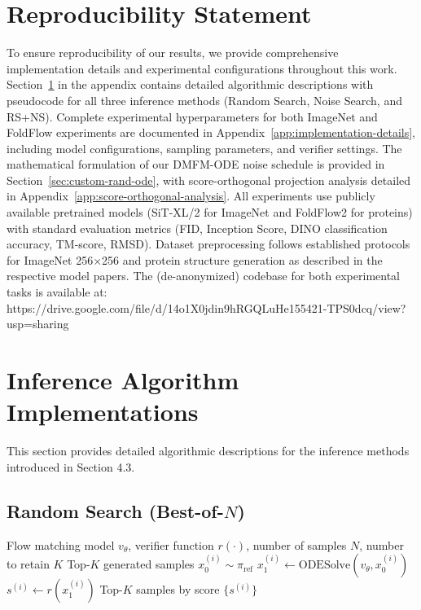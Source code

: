 \documentclass{article} %
\begin{document}
\section*{Reproducibility Statement}
To ensure reproducibility of our results, we provide comprehensive implementation details and experimental configurations throughout this work. Section~\ref{sec:algorithms} in the appendix contains detailed algorithmic descriptions with pseudocode for all three inference methods (Random Search, Noise Search, and RS+NS). Complete experimental hyperparameters for both ImageNet and FoldFlow experiments are documented in Appendix~\ref{app:implementation-details}, including model configurations, sampling parameters, and verifier settings. The mathematical formulation of our DMFM-ODE noise schedule is provided in Section~\ref{sec:custom-rand-ode}, with score-orthogonal projection analysis detailed in Appendix~\ref{app:score-orthogonal-analysis}. All experiments use publicly available pretrained models (SiT-XL/2 for ImageNet and FoldFlow2 for proteins) with standard evaluation metrics (FID, Inception Score, DINO classification accuracy, TM-score, RMSD). Dataset preprocessing follows established protocols for ImageNet 256×256 and protein structure generation as described in the respective model papers. The (de-anonymized) codebase for both experimental tasks is available at: https://drive.google.com/file/d/14o1X0jdin9hRGQLuHe155421-TPS0dcq/view?usp=sharing





\appendix

\section{Inference Algorithm Implementations}
\label{sec:algorithms}

This section provides detailed algorithmic descriptions for the inference methods introduced in Section 4.3.

\subsection{Random Search (Best-of-$N$)}
\label{app:random-search}

\begin{algorithm}[H]
\caption{Random Search (Best-of-$N$)}
\label{alg:best-of-n}
\begin{algorithmic}[1]
\Require Flow matching model $v_\theta$, verifier function $r(\cdot)$, number of samples $N$, number to retain $K$
\Ensure Top-$K$ generated samples
    \State $x_0^{(i)} \sim \pi_{\text{ref}}$ 
    \State $x_1^{(i)} \leftarrow \text{ODESolve}(v_\theta, x_0^{(i)})$ 
    \State $s^{(i)} \leftarrow r(x_1^{(i)})$ 
\EndFor
\State \Return Top-$K$ samples by score $\{s^{(i)}\}$
\end{algorithmic}
\end{algorithm}
\end{document}
